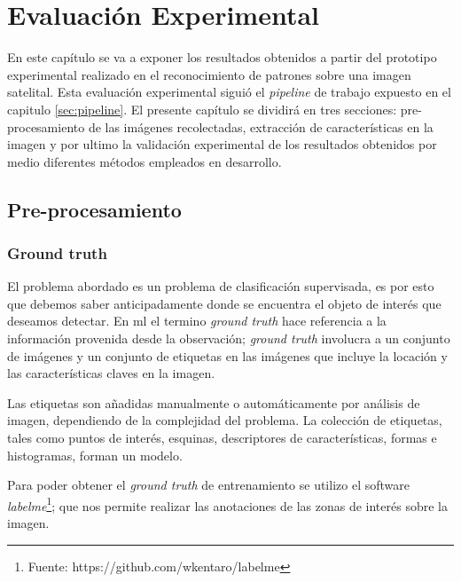 \chapter{Evaluación Experimental}\label{chap:evaluacion}

En este  capítulo se va a  exponer los resultados obtenidos a partir del prototipo experimental realizado en el reconocimiento de 
patrones sobre una imagen satelital. Esta evaluación experimental siguió el \textit{pipeline} de trabajo expuesto en el capitulo \ref{sec:pipeline}. El presente capítulo se dividirá en tres secciones: pre-procesamiento de las imágenes recolectadas, extracción de características en la imagen y por ultimo la validación experimental de los resultados obtenidos por medio diferentes métodos empleados en desarrollo.


\section{Pre-procesamiento}\label{sec:preprocesamiento}

\subsection{Ground truth}\label{sub:groundtruth}

El problema abordado es un problema de clasificación supervisada, es por esto que debemos saber anticipadamente donde se encuentra el objeto de interés que deseamos detectar. En \ac{ml} el termino \textit{ground truth} hace referencia a la información provenida desde la observación; \textit{ground truth} involucra a un conjunto de imágenes y un conjunto de etiquetas en las imágenes que incluye la locación y las características claves en la imagen.

Las etiquetas son añadidas manualmente o automáticamente por análisis de imagen, dependiendo de la complejidad del problema. La colección de etiquetas, tales como puntos de interés, esquinas, descriptores de características, formas e histogramas, forman un modelo.

Para poder obtener el \textit{ground truth} de entrenamiento se utilizo el software \textit{labelme}\footnote{Fuente: 
https://github.com/wkentaro/labelme}; que nos permite realizar las anotaciones de las zonas de interés sobre la imagen.


